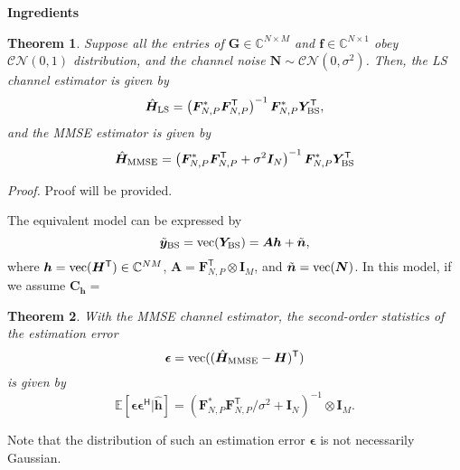 \documentclass[a4paper,12pt]{article}
\newtheorem{theorem}{\bf Theorem}
\def \T {^{\mathsf{T}}}
\def \H {^{\mathsf{H}}}
\begin{document}
{\color{blue}}{\textbf{Ingredients}}
\begin{theorem} 
    Suppose all the entries of ${\bm G}\in\mathbb{C}^{N\times M}$ and ${\bm f}\in\mathbb{C}^{N\times 1}$ obey ${\mathcal{CN}(0,1)}$ distribution, and the channel noise ${\bm N}\sim \mathcal{CN}(0,\sigma^2)$. 
    Then, the LS channel estimator is given by 
    \begin{equation}
        \hat{\bm{H}}_{\rm LS} = \left( {\bm F}_{N,P}^{*} {\bm F_{N,P}\T} \right)^{-1}{\bm F}_{N,P}^{*}{\bm Y}_{\rm BS}\T,
    \end{equation}
    and the MMSE estimator is given by 
    \begin{equation}
        \hat{\bm{H}}_{\rm MMSE} = \left( {\bm F}_{N,P}^{*} {\bm F_{N,P}\T + \sigma^2 {\bm I}_N} \right)^{-1}{\bm F}_{N,P}^{*}{\bm Y}_{\rm BS}\T
    \end{equation}
\end{theorem}

{\it Proof.}
Proof will be provided. 

The equivalent model can be expressed by 
\begin{equation}
    \tilde{\bm y}_{\rm BS} = {\rm vec}({\bm Y}_{\rm BS}) = {\bm A}{\bm h} + \tilde{\bm n},
\end{equation}
where ${\bm h} = {\rm vec}({\bm H}\T)\in\mathbb{C}^{NM}$, ${\bm A} = {\bm F}_{N,P}\T\otimes {\bm I}_M$, and $\tilde{\bm n} = {\rm vec}({\bm N})$. In this model, if we assume ${\bm C}_{\bm h} = $ 

\begin{theorem}
    With the MMSE channel estimator, the second-order statistics of the estimation error 
    \begin{equation}
        {\bm \epsilon} = {\rm vec}((\hat{{\bm H}}_{\rm MMSE} - {\bm H})\T)  
    \end{equation}
    is given by 
    \begin{equation}
        \mathbb{E}[{\bm \epsilon}{\bm \epsilon}\H | \hat{\bm h}] = \left( {\bm F}_{N,P}^{*} {\bm F_{N,P}\T / \sigma^2 + {\bm I}_N} \right)^{-1} \otimes {\bm I}_M.
    \end{equation}
\end{theorem}

Note that the distribution of such an estimation error ${\bm \epsilon}$ is not necessarily Gaussian. 
\end{document}
